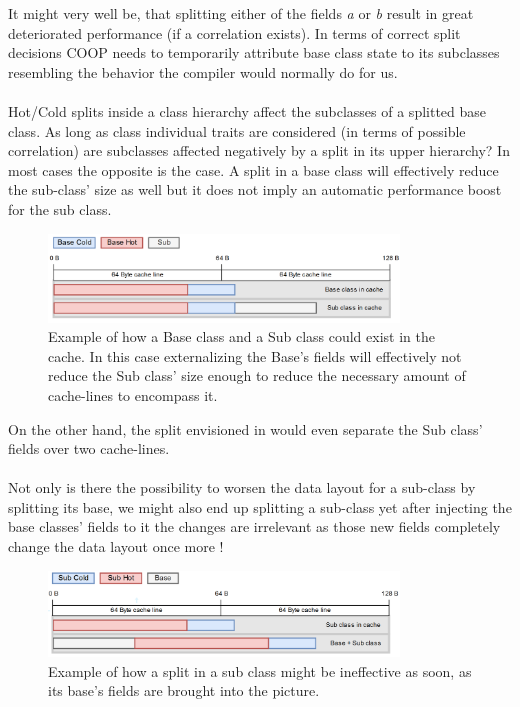 It might very well be, that splitting either of the fields \textit{a} or \textit{b} result in great deteriorated performance (if a correlation exists). In terms of correct split decisions COOP needs to temporarily attribute base class state to its subclasses resembling the behavior the compiler would normally do for us.\\\\
Hot/Cold splits inside a class hierarchy affect the subclasses of a splitted base class. As long as class individual traits are considered (in terms of possible correlation) are subclasses affected negatively by a split in its upper hierarchy? In most cases the opposite is the case. A split in a base class will effectively reduce the sub-class' size as well but it does not imply an automatic performance boost for the sub class.
\begin{figure}[!htbp]
	\centering
	\includegraphics[width=0.83\textwidth,height=0.25\textwidth]{PICs/inheritance_split}
	\caption{Example of how a Base class and a Sub class could exist in the cache. In this case externalizing the Base's fields will effectively not reduce the Sub class' size enough to reduce the necessary amount of cache-lines to encompass it.}
	\label{inheritance_split}
\end{figure}
On the other hand, the split envisioned in  would even separate the Sub class' fields over two cache-lines.\\\\
Not only is there the possibility to worsen the data layout for a sub-class by splitting its base, we might also end up splitting a sub-class yet after injecting the base classes' fields to it the changes are irrelevant as those new fields completely change the data layout once more !
\begin{figure}[!htbp]
	\centering
	\includegraphics[width=0.83\textwidth,height=0.25\textwidth]{PICs/inheritance_split_2}
	\caption{Example of how a split in a sub class might be ineffective as soon, as its base's fields are brought into the picture.}
	\label{inheritance_split_2}
\end{figure}

